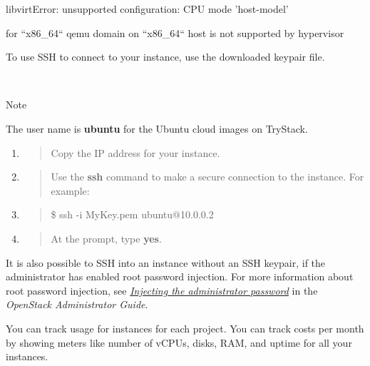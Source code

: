 libvirtError: unsupported configuration: CPU mode 'host-model'

for ``x86\_64`` qemu domain on ``x86\_64`` host is not supported by
hypervisor

\label{connect-to-your-instance-by-using-ssh}

To use SSH to connect to your instance, use the downloaded keypair file.

~

Note

The user name is \textbf{ubuntu} for the Ubuntu cloud images on
TryStack.

\begin{enumerate}
\def\labelenumi{\arabic{enumi}.}
\item
  \begin{quote}
  Copy the IP address for your instance.
  \end{quote}
\item
  \begin{quote}
  Use the \textbf{ssh} command to make a secure connection to the
  instance. For example:
  \end{quote}
\item
  \begin{quote}
  \$ ssh -i MyKey.pem ubuntu@10.0.0.2
  \end{quote}
\item
  \begin{quote}
  At the prompt, type \textbf{yes}.
  \end{quote}
\end{enumerate}

It is also possible to SSH into an instance without an SSH keypair, if
the administrator has enabled root password injection. For more
information about root password injection, see
\href{https://docs.openstack.org/nova/\osversion/admin/admin-password-injection.html}{\emph{Injecting the administrator password}} in the \emph{OpenStack Administrator
Guide}.

\label{track-usage-for-instances}

You can track usage for instances for each project. You can track costs
per month by showing meters like number of vCPUs, disks, RAM, and uptime
for all your instances.

